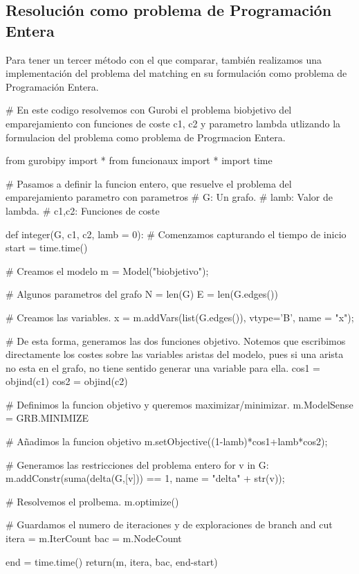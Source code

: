 \documentclass[twoside,a4paper,openright,12pt]{book}
\begin{document}
\subsection{Resolución como problema de Programación Entera}
Para tener un tercer método con el que comparar, también realizamos una implementación del problema del matching en su formulación como problema de Programación Entera.
\begin{pythone}
# En este codigo resolvemos con Gurobi el problema biobjetivo del emparejamiento con funciones de coste c1, c2 y parametro lambda utlizando la formulacion del problema como problema de Progrmacion Entera.

from gurobipy import *
from funcionaux import *
import time

# Pasamos a definir la funcion entero, que resuelve el problema del emparejamiento parametro con parametros
# G: Un grafo.
# lamb: Valor de lambda.
# c1,c2: Funciones de coste

def integer(G, c1, c2, lamb = 0):
 	# Comenzamos capturando el tiempo de inicio   
    start = time.time()
    
    # Creamos el modelo
    m = Model("biobjetivo");
   
    # Algunos parametros del grafo
    N = len(G)
    E = len(G.edges())
    
    # Creamos las variables.
    x = m.addVars(list(G.edges()), vtype='B', name = "x");
    
    # De esta forma, generamos las dos funciones objetivo. Notemos que escribimos directamente los costes sobre las variables aristas  del modelo, pues si una arista no esta en el grafo, no tiene sentido generar una variable para ella.       
    cos1 = objind(c1)
    cos2 = objind(c2)
    
    # Definimos la funcion objetivo y queremos maximizar/minimizar.
    m.ModelSense = GRB.MINIMIZE
    
    # Añadimos la funcion objetivo
    m.setObjective((1-lamb)*cos1+lamb*cos2); 
    
    # Generamos las restricciones del problema entero
    for v in G:
        m.addConstr(suma(delta(G,[v])) == 1, name = "delta" + str(v));
    
    # Resolvemos el prolbema.
    m.optimize()
    
    # Guardamos el numero de iteraciones y de exploraciones de branch and cut
    itera = m.IterCount
    bac = m.NodeCount
    
    end = time.time()
    return(m, itera, bac, end-start)
\end{pythone}
\newpage
\end{document}
